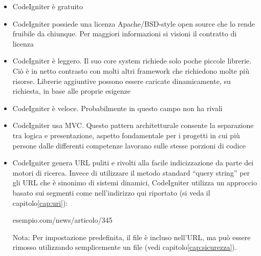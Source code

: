 \begin{itemize}
\item CodeIgniter è gratuito
\item CodeIgniter possiede una licenza Apache/BSD-style open source che lo rende fruibile da chiunque. Per maggiori informazioni si visioni il contratto di licenza
\item CodeIgniter è leggero. Il suo core system richiede solo poche piccole librerie. Ciò è in netto contrasto con molti altri framework che richiedono molte più risorse. Librerie aggiuntive possono essere caricate dinamicamente, su richiesta, in base alle proprie esigenze
\item CodeIgniter è veloce. Probabilmente in questo campo non ha rivali
\item CodeIgniter usa \ac{MVC}. Questo pattern architetturale consente la separazione tra logica e presentazione, aspetto fondamentale per i progetti in cui più persone dalle differenti competenze lavorano sulle stesse porzioni di codice
\item CodeIgniter genera \ac{URL} puliti e rivolti alla facile indicizzazione da parte dei motori di ricerca. Invece di utilizzare il metodo standard ``query string'' per gli \ac{URL} che è sinonimo di sistemi dinamici, CodeIgniter utilizza un approccio basato sui segmenti come nell'indirizzo qui riportato (si veda il capitolo\vref{cap:uri}):

\begin{code}
esempio.com/news/articolo/345
\end{code}

Nota: Per impostazione predefinita, il file  è incluso nell'\ac{URL}, ma può essere rimosso utilizzando semplicemente un file  (vedi capitolo\vref{cap:sicurezza}).


\end{itemize}
